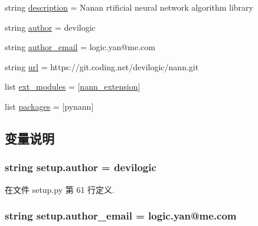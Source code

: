 \begin{DoxyCompactItemize}
\item 
string \hyperlink{namespacesetup_ade8aa54df2083113a10326ea2fe7934b}{description} = \textquotesingle{}Nanan rtificial neural network algorithm library\textquotesingle{}
\item 
string \hyperlink{namespacesetup_ac83393287a89728d636e4ae9f4ac914f}{author} = \textquotesingle{}devilogic\textquotesingle{}
\item 
string \hyperlink{namespacesetup_aa144ac52ed417d5c65d7377e0e75673e}{author\+\_\+email} = \textquotesingle{}logic.\+yan@me.\+com\textquotesingle{}
\item 
string \hyperlink{namespacesetup_a3376e8b9735800b5b9e455914cee908d}{url} = \textquotesingle{}https\+://git.\+coding.\+net/devilogic/nann.\+git\textquotesingle{}
\item 
list \hyperlink{namespacesetup_a657516be9ed3c70ce05f5f6918206934}{ext\+\_\+modules} = \mbox{[}\hyperlink{namespacesetup_aebabf02abf54d1e0cd11949d52c28be5}{nann\+\_\+extension}\mbox{]}
\item 
list \hyperlink{namespacesetup_aada4406eeab94f62c5f72fee617f0b82}{packages} = \mbox{[}\textquotesingle{}pynann\textquotesingle{}\mbox{]}
\end{DoxyCompactItemize}


\subsection{变量说明}
\hypertarget{namespacesetup_ac83393287a89728d636e4ae9f4ac914f}{}
\subsubsection[{author}]{\setlength{\rightskip}{0pt plus 5cm}string setup.\+author = \textquotesingle{}devilogic\textquotesingle{}}\label{namespacesetup_ac83393287a89728d636e4ae9f4ac914f}


在文件 setup.\+py 第 61 行定义.

\hypertarget{namespacesetup_aa144ac52ed417d5c65d7377e0e75673e}{}
\subsubsection[{author\+\_\+email}]{\setlength{\rightskip}{0pt plus 5cm}string setup.\+author\+\_\+email = \textquotesingle{}logic.\+yan@me.\+com\textquotesingle{}}\label{namespacesetup_aa144ac52ed417d5c65d7377e0e75673e}


